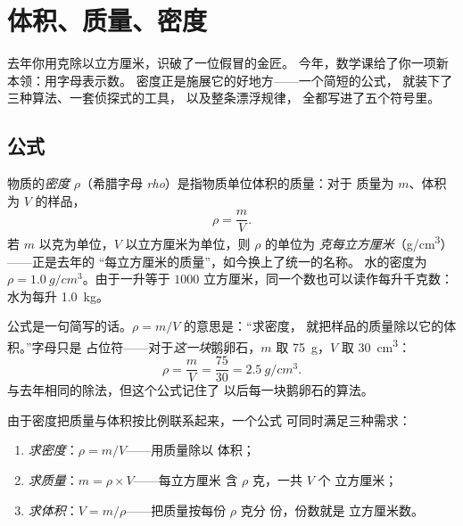 \chapter{体积、质量、密度}\label{ch:g7:volume-mass-density}

去年你用克除以立方厘米，识破了一位假冒的金匠。
今年，数学课给了你一项新本领：用字母表示数。
密度正是施展它的好地方——一个简短的公式，
就装下了三种算法、一套侦探式的工具，
以及整条漂浮规律，
全都写进了五个符号里。

\section{公式}

\begin{definition}[公式形式的密度]\label{def:g7:volume-mass-density:formula}
物质的\emph{密度} $\rho$（希腊字母
\emph{rho}）是指物质单位体积的质量：对于
质量为 $m$、体积为 $V$ 的样品，
\[
\rho = \frac{m}{V}.
\]
若 $m$ 以克为单位，$V$ 以立方厘米为单位，则 $\rho$ 的单位为
\emph{克每立方厘米}（\unit{g/cm^3}）——正是去年的
“每立方厘米的质量”，如今换上了统一的名称。
水的密度为 $\rho = \qty{1.0}{g/cm^3}$。由于一升等于
$1000$ 立方厘米，同一个数也可以读作每升千克数：
水为每升 \qty{1.0}{kg}。
\end{definition}

\begin{example}[读懂字母]\label{ex:g7:volume-mass-density:reading}
公式是一句简写的话。$\rho = m/V$ 的意思是：“求密度，
就把样品的质量除以它的体积。”字母只是
占位符——对于\emph{这一块}鹅卵石，$m$ 取
\qty{75}{g}，$V$ 取 \qty{30}{cm^3}：
\[
\rho = \frac{m}{V} = \frac{75}{30} = \qty{2.5}{g/cm^3}.
\]
与去年相同的除法，但这个公式记住了
以后每一块鹅卵石的算法。
\end{example}

\begin{proposition}[一个公式的三种算法]\label{prop:g7:volume-mass-density:recipes}
由于密度把质量与体积按比例联系起来，一个公式
可同时满足三种需求：
\begin{enumerate}
  \item \emph{求密度}：$\rho = m/V$——用质量除以
        体积；
  \item \emph{求质量}：$m = \rho \times V$——每立方厘米
        含 $\rho$ 克，一共 $V$ 个
        立方厘米；
  \item \emph{求体积}：$V = m/\rho$——把质量按每份 $\rho$ 克分
        份，份数就是
        立方厘米数。
\end{enumerate}
\end{proposition}

